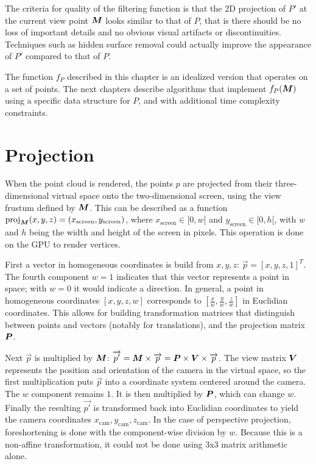 \documentclass[a4paper,10pt,abstracton,notitlepage]{scrreprt}
\begin{document}
The criteria for quality of the filtering function is that the 2D projection of $P'$ at the current view point $\matrixsym{M}$ looks similar to that of $P$, that is there should be no loss of important details and no obvious visual artifacts or discontinuities. Techniques such as hidden surface removal could actually improve the appearance of $P'$ compared to that of $P$.

The function $f_{P}$ described in this chapter is an idealized version that operates on a set of points. The next chapters describe algorithms that implement $f_{P}(\matrixsym{M})$ using a specific data structure for $P$, and with additional time complexity constraints.


\section{Projection}
When the point cloud is rendered, the points $p$ are projected from their three-dimensional virtual space onto the two-dimensional screen, using the view frustum defined by $\matrixsym{M}$. This can be described as a function $\mathrm{proj}_{\matrixsym{M}}(x, y, z) = (x_{\mathrm{screen}}, y_{\mathrm{screen}})$, where $x_{\mathrm{screen}} \in [0, w[$ and $y_{\mathrm{screen}} \in [0, h[$, with $w$ and $h$ being the width and height of the screen in pixels. This operation is done on the GPU to render vertices.

First a vector in homogeneous coordinates is build from $x, y, z$: $\overrightarrow{p} = [x, y, z, 1]^{T}$. The fourth component $w = 1$ indicates that this vector represents a point in space; with $w = 0$ it would indicate a direction. In general, a point in homogeneous coordinates $[x, y, z, w]$ corresponds to $[\frac{x}{w}, \frac{y}{w}, \frac{z}{w}]$ in Euclidian coordinates. This allows for building transformation matrices that distinguish between points and vectors (notably for translations), and the projection matrix $\matrixsym{P}$.

Next $\overrightarrow{p}$ is multiplied by $\matrixsym{M}$: $\overrightarrow{p'} = \matrixsym{M} \times \overrightarrow{p} = \matrixsym{P} \times \matrixsym{V} \times \overrightarrow{p}$. The view matrix $\matrixsym{V}$ represents the position and orientation of the camera in the virtual space, so the first multiplication puts $\overrightarrow{p}$ into a coordinate system centered around the camera. The $w$ component remains $1$. It is then multiplied by $\matrixsym{P}$, which can change $w$. Finally the resulting $\overrightarrow{p'}$ is transformed back into Euclidian coordinates to yield the camera coordinates $x_{\mathrm{cam}}, y_{\mathrm{cam}}, z_{\mathrm{cam}}$. In the case of perspective projection, foreshortening is done with the component-wise division by $w$. Because this is a non-affine transformation, it could not be done using 3x3 matrix arithmetic alone.
\end{document}

